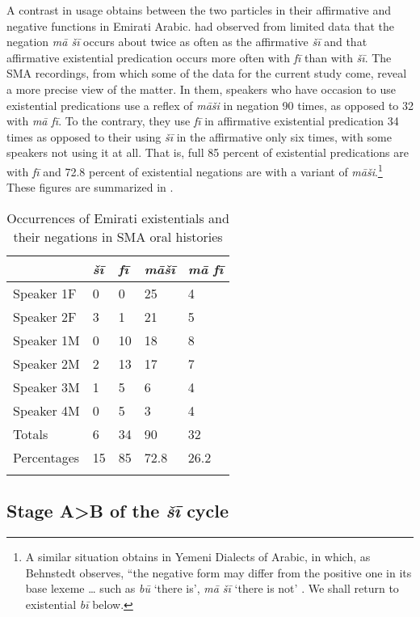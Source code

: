 \documentclass[output=paper,colorlinks,citecolor=brown]{langscibook}
\begin{document}
A contrast in usage obtains between the two particles in their affirmative and negative functions in Emirati Arabic. \citet[528]{wilmsen2020a} had observed from limited data that the negation \textit{mā šī} occurs about twice as often as the affirmative \textit{šī} and that affirmative existential predication occurs more often with \textit{fī} than with \textit{šī}. The SMA recordings, from which some of the data for the current study come, reveal a more precise view of the matter. In them, speakers who have occasion to use existential predications use a reflex of \textit{māši} in negation 90 times, as opposed to 32 with \textit{mā fī}. To the contrary, they use \textit{fī} in affirmative existential predication 34 times as opposed to their using \textit{šī} in the affirmative only six times, with some speakers not using it at all. That is, full 85 percent of existential predications are with \textit{fī} and 72.8 percent of existential negations are with a variant of \textit{māši}.\footnote{A similar situation obtains in Yemeni Dialects of Arabic, in which, as Behnstedt observes, “the negative form may differ from the positive one in its base lexeme … such as \textit{bū} ‘there is’, \textit{mā šī} ‘there is not’ \citeyearpar[345]{behnstedt2016a}. We shall return to existential \textit{bī} below.} These figures are summarized in .

\begin{table}
	\centering
	\caption{Occurrences of Emirati existentials and their negations in SMA oral histories}
	\label{tab:WiAR-2}
\begin{tabularx}{\textwidth}{lYYYY}
\lsptoprule
\textit{} & \textit{šī} & \textit{fī} & \textit{māšī} & \textit{mā fī} \\ \midrule
Speaker 1F & 0 & 0 & 25 & 4 \\
Speaker 2F & 3 & 1 & 21 & 5 \\
Speaker 1M & 0 & 10 & 18 & 8 \\
Speaker 2M & 2 & 13 & 17 & 7 \\
Speaker 3M & 1 & 5 & 6 & 4 \\
Speaker 4M & 0 & 5 & 3 & 4 \\ \midrule
Totals & 6 & 34 & 90 & 32 \\ \midrule
Percentages & 15 & 85 & 72.8 & 26.2 \\ \lspbottomrule   
\end{tabularx}
\end{table}

\subsection{Stage A>B of the \textit{šī} cycle} \label{s:WiAR-3.1}
\end{document}
